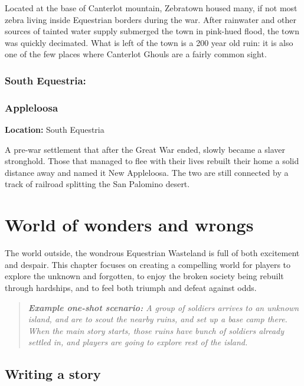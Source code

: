 \documentclass[11pt,a4paper,twocolumn]{book}
\begin{document}
    Located at the base of Canterlot mountain, Zebratown housed many, if not most zebra living inside Equestrian borders during the war. After rainwater and other sources of tainted water supply submerged the town in pink-hued flood, the town was quickly decimated. What is left of the town is a 200 year old ruin: it is also one of the few places where Canterlot Ghouls are a fairly common sight.
    
    \subsection*{South Equestria:}
    
    \subsection*{Appleloosa}
    \textbf{Location:} South Equestria
    
    A pre-war settlement that after the Great War ended, slowly became a slaver stronghold. Those that managed to flee with their lives rebuilt their home a solid distance away and named it New Appleloosa. The two are still connected by a track of railroad splitting the San Palomino desert.  
 
   
    
    \chapter{World of wonders and wrongs}
    
    The world outside, the wondrous Equestrian Wasteland is full of both excitement and despair. This chapter focuses on creating a compelling world for players to explore the unknown and forgotten, to enjoy the broken society being rebuilt through hardships, and to feel both triumph and defeat against odds.
    
    \begin{quote}
        \emph{\textbf{Example one-shot scenario:} A group of soldiers arrives to an unknown island, and are to scout the nearby ruins, and set up a base camp there. When the main story starts, those ruins have bunch of soldiers already settled in, and players are going to explore rest of the island.}
    \end{quote}
   
    \section*{Writing a story}
    
\end{document}
